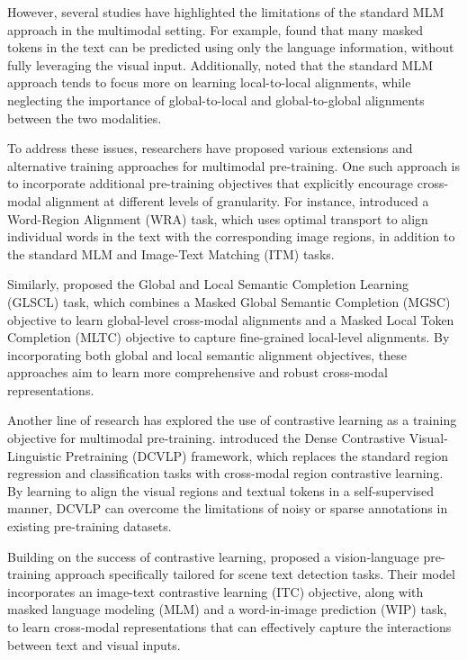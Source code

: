 \documentclass[11pt]{article}
\begin{document}
However, several studies have highlighted the limitations of the standard MLM approach in the multimodal setting. For example, \cite{ref120} found that many masked tokens in the text can be predicted using only the language information, without fully leveraging the visual input. Additionally, \cite{ref118} noted that the standard MLM approach tends to focus more on learning local-to-local alignments, while neglecting the importance of global-to-local and global-to-global alignments between the two modalities.

To address these issues, researchers have proposed various extensions and alternative training approaches for multimodal pre-training. One such approach is to incorporate additional pre-training objectives that explicitly encourage cross-modal alignment at different levels of granularity. For instance, \cite{ref117} introduced a Word-Region Alignment (WRA) task, which uses optimal transport to align individual words in the text with the corresponding image regions, in addition to the standard MLM and Image-Text Matching (ITM) tasks.

Similarly, \cite{ref121} proposed the Global and Local Semantic Completion Learning (GLSCL) task, which combines a Masked Global Semantic Completion (MGSC) objective to learn global-level cross-modal alignments and a Masked Local Token Completion (MLTC) objective to capture fine-grained local-level alignments. By incorporating both global and local semantic alignment objectives, these approaches aim to learn more comprehensive and robust cross-modal representations.

Another line of research has explored the use of contrastive learning as a training objective for multimodal pre-training. \cite{ref122} introduced the Dense Contrastive Visual-Linguistic Pretraining (DCVLP) framework, which replaces the standard region regression and classification tasks with cross-modal region contrastive learning. By learning to align the visual regions and textual tokens in a self-supervised manner, DCVLP can overcome the limitations of noisy or sparse annotations in existing pre-training datasets.

Building on the success of contrastive learning, \cite{ref123} proposed a vision-language pre-training approach specifically tailored for scene text detection tasks. Their model incorporates an image-text contrastive learning (ITC) objective, along with masked language modeling (MLM) and a word-in-image prediction (WIP) task, to learn cross-modal representations that can effectively capture the interactions between text and visual inputs.
\end{document}
